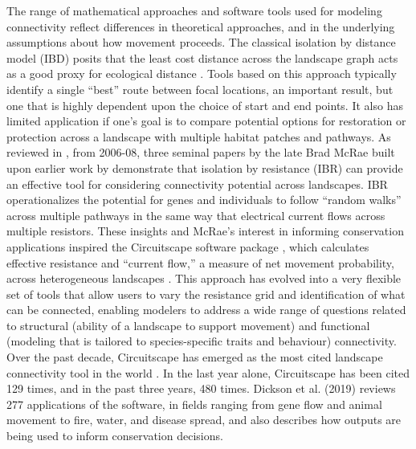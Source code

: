 \documentclass{juliacon}
\begin{document}
The range of mathematical approaches and software tools used for modeling connectivity reflect differences in theoretical approaches, and in the underlying assumptions about how movement proceeds. The classical isolation by distance model (IBD) posits that the least cost distance across the landscape graph acts as a good proxy for ecological distance \cite{wright1943isolation}.  Tools based on this approach typically identify a single “best” route between focal locations, an important result, but one that is highly dependent upon the choice of start and end points. It also has limited application if one’s goal is to compare potential options for restoration or protection across a landscape with multiple habitat patches and pathways.  As reviewed in \cite{dickson2019circuit}, from 2006-08, three seminal papers by the late Brad McRae built upon earlier work by \cite{doyle1984random} demonstrate that isolation by resistance (IBR)\cite{mcrae2006isolation} can provide an effective tool for considering connectivity potential across landscapes. IBR operationalizes the potential for genes and individuals to follow “random walks” across multiple pathways in the same way that electrical current flows across multiple resistors. These insights and McRae’s interest in informing conservation applications inspired the Circuitscape software package \cite{mcrae2008using}, which calculates effective resistance and “current flow,” a measure of net movement probability, across heterogeneous landscapes \cite{dickson2019circuit}.  This approach has evolved into a very flexible set of tools that allow users to vary the resistance grid and identification of what can be connected, enabling modelers to address a wide range of questions related to structural (ability of a landscape to support movement) and functional (modeling that is tailored to species-specific traits and behaviour) connectivity.  
Over the past decade, Circuitscape has emerged as the most cited landscape connectivity tool in the world \cite{dickson2019circuit}. In the last year alone, Circuitscape has been cited 129 times, and in the past three years, 480 times. Dickson et al. (2019) reviews 277 applications of the software, in fields ranging from gene flow and animal movement to fire, water, and disease spread, and also describes how outputs are being used to inform conservation decisions. 
\end{document}
